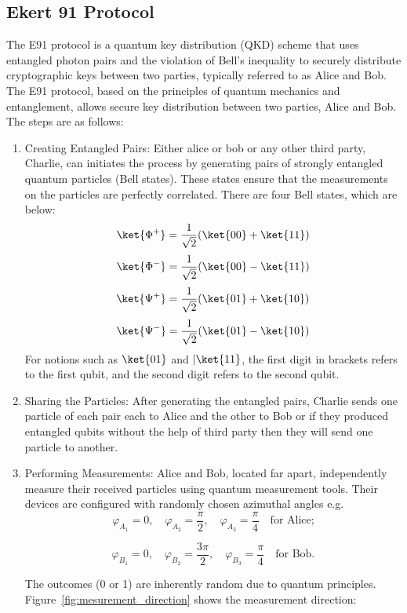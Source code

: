 \documentclass[12pt]{article}
\begin{document}
\subsection{Ekert 91 Protocol}
\label{sec:e91}
The E91 protocol is a quantum key distribution (QKD) scheme that uses entangled photon pairs and the violation of Bell's inequality to securely distribute cryptographic keys between two parties, typically referred to as Alice and Bob. The E91 protocol, based on the principles of quantum mechanics and entanglement, allows secure key distribution between two parties, Alice and Bob. The steps are as follows:
\begin{enumerate}
  \item Creating Entangled Pairs: Either alice or bob or any other third party, Charlie, can initiates the process by generating pairs of strongly entangled quantum particles (Bell states). These states ensure that the measurements on the particles are perfectly correlated. There are four Bell states, which are below:
        \[\ket{\Phi^{+}}=\frac{1}{\sqrt{2}}(\ket{00}+\ket{11})\]
        \[\ket{\Phi^{-}}=\frac{1}{\sqrt{2}}(\ket{00}-\ket{11})\]
        \[\ket{\Psi^{+}}=\frac{1}{\sqrt{2}}(\ket{01}+\ket{10})\]
        \[\ket{\Psi^{-}}=\frac{1}{\sqrt{2}}(\ket{01}-\ket{10})\]
        For notions such as $\ket{01}$ and $|\ket{11}$, the first digit in brackets refers to the first qubit, and the second digit refers to the second qubit.

  \item Sharing the Particles: After generating the entangled pairs, Charlie sends one particle of each pair each to Alice and the other to Bob or if they produced entangled qubits without the help of third party then they will send one particle to another.
  \item Performing Measurements: Alice and Bob, located far apart, independently measure their received particles using quantum measurement tools. Their devices are configured with randomly chosen azimuthal angles e.g.  \[
          \varphi_{A_1} = 0, \quad \varphi_{A_2} = \frac{\pi}{2}, \quad \varphi_{A_3} = \frac{\pi}{4} \quad \text{for Alice;}
        \]

        \[
          \varphi_{B_1} = 0, \quad \varphi_{B_2} = \frac{3\pi}{2}, \quad \varphi_{B_3} = \frac{\pi}{4} \quad \text{for Bob.}
        \]

        The outcomes (0 or 1) are inherently random due to quantum principles.
        Figure~\ref{fig:mesurement_direction} shows the measurement direction:


\end{enumerate}
\end{document}
